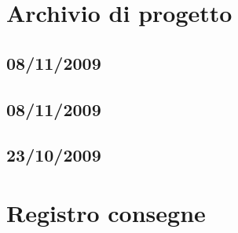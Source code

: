 \documentclass[a4paper, 12pt]{report}
\begin{document}
\tableofcontents

\newpage



\chapter{Archivio di progetto}

\section{08/11/2009}















 
\section{08/11/2009}





\section{23/10/2009}




\chapter{Registro consegne}
%
\end{document}
